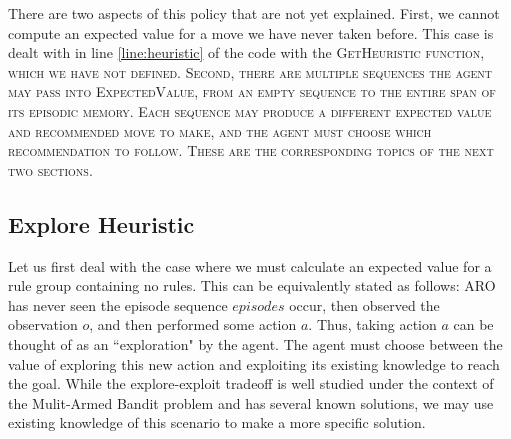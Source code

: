 \documentclass[letterpaper]{article} %
\begin{document}
There are two aspects of this policy that are not yet explained. First, we cannot compute an expected value for a move we have never taken before. This case is dealt with in line \ref{line:heuristic} of the code with the \scshape GetHeuristic \normalfont function, which we have not defined. Second, there are multiple sequences the agent may pass into \scshape ExpectedValue\normalfont, from an empty sequence to the entire span of its episodic memory. Each sequence may produce a different expected value and recommended move to make, and the agent must choose which recommendation to follow. These are the corresponding topics of the next two sections.

\subsection{Explore Heuristic}
Let us first deal with the case where we must calculate an expected value for a rule group containing no rules. This can be equivalently stated as follows: ARO has never seen the episode sequence $episodes$ occur, then observed the observation $o$, and then performed some action $a$. Thus, taking action $a$ can be thought of as an ``exploration" by the agent. The agent must choose between the value of exploring this new action and exploiting its existing knowledge to reach the goal. While the explore-exploit tradeoff is well studied under the context of the Mulit-Armed Bandit problem and has several known solutions, we may use existing knowledge of this scenario to make a more specific solution. 
\end{document}
